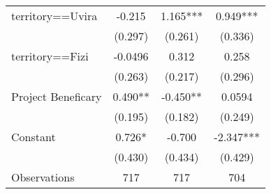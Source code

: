 {\begin{tabular}{l*{3}{c}}
territory==Uvira    &      -0.215   &       1.165***&       0.949***\\
                    &     (0.297)   &     (0.261)   &     (0.336)   \\
[1em]
territory==Fizi     &     -0.0496   &       0.312   &       0.258   \\
                    &     (0.263)   &     (0.217)   &     (0.296)   \\
[1em]
Project Beneficary  &       0.490** &      -0.450** &      0.0594   \\
                    &     (0.195)   &     (0.182)   &     (0.249)   \\
[1em]
Constant            &       0.726*  &      -0.700   &      -2.347***\\
                    &     (0.430)   &     (0.434)   &     (0.429)   \\
\hline
Observations        &         717   &         717   &         704   \\
\hline\hline
\end{tabular}
}
